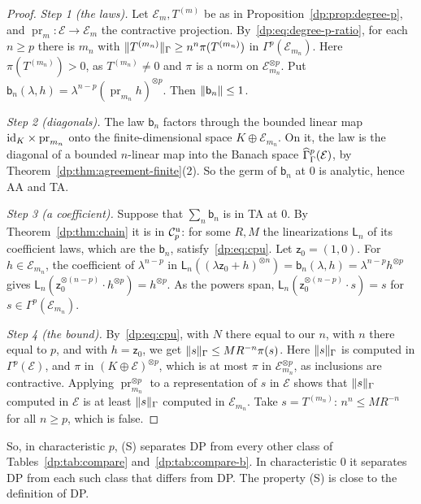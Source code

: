 \begin{proof}
\emph{Step 1 (the laws).} Let $\mathcal E_m,T^{(m)}$ be as in Proposition~\ref{dp:prop:degree-p}, and $\operatorname{pr}_m\colon\mathcal E\to\mathcal E_m$ the contractive projection. By~\eqref{dp:eq:degree-p-ratio}, for each $n\ge p$ there is $m_n$ with $\lVert T^{(m_n)}\rVert_\Gamma\ge n^n\pi(T^{(m_n)})$ in $\Gamma^p(\mathcal E_{m_n})$. Here $\pi(T^{(m_n)})>0$, as $T^{(m_n)}\ne0$ and $\pi$ is a norm on $\mathcal E_{m_n}^{\otimes p}$. Put $\mathsf b_n(\lambda,h)=\lambda^{n-p}(\operatorname{pr}_{m_n}h)^{\otimes p}$. Then $\lVert \mathsf b_n\rVert\le1$.

\emph{Step 2 (diagonals).} The law $\mathsf b_n$ factors through the bounded linear map $\mathrm{id}_K\times\operatorname{pr}_{m_n}$ onto the finite-dimensional space $K\oplus\mathcal E_{m_n}$. On it, the law is the diagonal of a bounded $n$\nobreakdash-linear map into the Banach space $\widehat\Gamma^p_\Gamma(\mathcal E)$, by Theorem~\ref{dp:thm:agreement-finite}(2). So the germ of $\mathsf b_n$ at $0$ is analytic, hence AA and TA.

\emph{Step 3 (a coefficient).} Suppose that $\sum_n\mathsf b_n$ is in TA at $0$. By Theorem~\ref{dp:thm:chain} it is in $\mathcal{C}_p^{\rm u}$: for some $R,M$ the linearizations $\mathsf L_n$ of its coefficient laws, which are the $\mathsf b_n$, satisfy~\eqref{dp:eq:cpu}. Let $\mathsf z_0=(1,0)$. For $h\in\mathcal E_{m_n}$, the coefficient of $\lambda^{n-p}$ in $\mathsf L_n((\lambda\mathsf z_0+h)^{\otimes n})=\mathsf b_n(\lambda,h)=\lambda^{n-p}h^{\otimes p}$ gives $\mathsf L_n(\mathsf z_0^{\otimes(n-p)}\cdot h^{\otimes p})=h^{\otimes p}$. As the powers span, $\mathsf L_n(\mathsf z_0^{\otimes(n-p)}\cdot s)=s$ for $s\in\Gamma^p(\mathcal E_{m_n})$.

\emph{Step 4 (the bound).} By~\eqref{dp:eq:cpu}, with $N$ there equal to our $n$, with $n$ there equal to $p$, and with $h=\mathsf z_0$, we get $\lVert s\rVert_\Gamma\le MR^{-n}\pi(s)$. Here $\lVert s\rVert_\Gamma$ is computed in $\Gamma^p(\mathcal E)$, and $\pi$ in $(K\oplus\mathcal E)^{\otimes p}$, which is at most $\pi$ in $\mathcal E_{m_n}^{\otimes p}$, as inclusions are contractive. Applying $\operatorname{pr}_{m_n}^{\otimes p}$ to a representation of $s$ in $\mathcal E$ shows that $\lVert s\rVert_\Gamma$ computed in $\mathcal E$ is at least $\lVert s\rVert_\Gamma$ computed in $\mathcal E_{m_n}$. Take $s=T^{(m_n)}$: $n^n\le MR^{-n}$ for all $n\ge p$, which is false.
\end{proof}

So, in characteristic $p$, (S) separates DP from every other class of Tables~\ref{dp:tab:compare} and~\ref{dp:tab:compare-b}. In characteristic $0$ it separates DP from each such class that differs from DP. The property (S) is close to the definition of DP.

